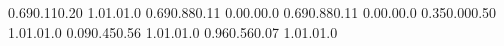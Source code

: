 \documentclass[a5paper,9pt]{scrreprt}
\begin{document}
\thispagestyle{empty}

\setslotsize{4.44cm}{0.203cm}
\settextframe{0.8mm}

\seteventcornerradius{0pt}


  {0.69}{0.11}{0.20}   {1.0}{1.0}{1.0}  %
  {0.69}{0.88}{0.11}   {0.0}{0.0}{0.0}  %
 {0.69}{0.88}{0.11}   {0.0}{0.0}{0.0}  %
 {0.35}{0.00}{0.50}   {1.0}{1.0}{1.0}  %
     {0.09}{0.45}{0.56}   {1.0}{1.0}{1.0}  %
 {0.96}{0.56}{0.07}   {1.0}{1.0}{1.0}  %
\end{document}
